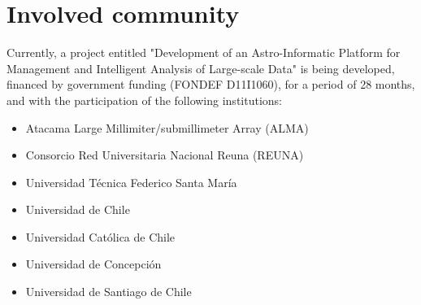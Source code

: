 %
%
%
%
%
%
%
%
%
%
%
%

\section{Involved community}

Currently, a project entitled "Development of an Astro-Informatic Platform
for Management and Intelligent Analysis of Large-scale Data" is being developed,
financed by government funding (FONDEF D11I1060), for a period of 28 months,
and with the participation of the following institutions:

\begin{itemize}
	\item Atacama Large Millimiter/submillimeter Array (ALMA)
	\item Consorcio Red Universitaria Nacional Reuna (REUNA)
	\item Universidad Técnica Federico Santa María
	\item Universidad de Chile
	\item Universidad Católica de Chile
	\item Universidad de Concepción
	\item Universidad de Santiago de Chile
\end{itemize}

